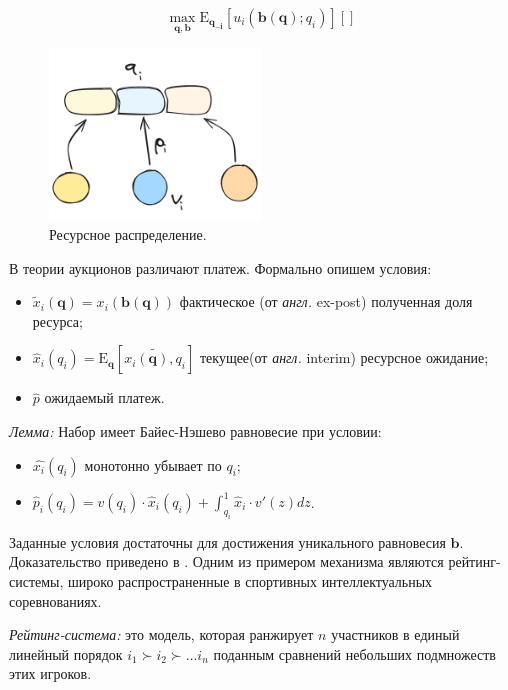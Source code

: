 \begin{equation}
    \max_{\mathbf{q},\mathbf{b}} \mathrm{E}_{\mathbf{q_{-i}}}\left[u_i(\mathbf{b}(\mathbf{q});q_i)\right] \left[\right] 
\end{equation}

\begin{figure}[h]
    \centering
    \includegraphics[width=0.5\textwidth]{assets/pedagogic/social/mech.excalidraw.png}
    \caption{Ресурсное распределение.}
    \label{utility}
\end{figure}


В теории \cite{bulow1989simple} аукционов различают платеж. Формально опишем условия: 
\begin{itemize}
    \item $\tilde{x}_i(\mathbf{q}) = x_i(\mathbf{b}(\mathbf{q}))$ фактическое (от \textit{англ.} ex-post) полученная доля ресурса;
    \item $\hat{x}_i(q_i) = \mathrm{E}_\mathbf{q} \left[\tilde{x_i(\mathbf{q}),q_i}\right]$ текущее(от \textit{англ.} interim) ресурсное ожидание;
    \item $\hat{p}$ ожидаемый платеж.
\end{itemize}


\textit{Лемма:} Набор имеет Байес-Нэшево равновесие при условии:
 \begin{itemize}
    \item $\hat{x_i}(q_i)$ монотонно убывает по $q_i$;
    \item $\hat{p}_i(q_i) = v(q_i) \cdot \hat{x}_i(q_i) + \int_{q_i}^1 \hat{x}_i \cdot v'(z) dz$.
\end{itemize}
Заданные условия достаточны для достижения уникального равновесия $\mathbf{b}$. Доказательство приведено в \cite{myerson1981optimal}.
Одним из примером механизма являются рейтинг-системы, широко распространенные в спортивных интеллектуальных соревнованиях.

\textit{Рейтинг-система:} это модель, которая ранжирует $n$ участников в единый линейный порядок $i_1 \succ i_2 \succ \dots i_n$
поданным сравнений небольших подмножеств этих игроков.
 
